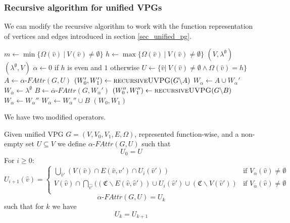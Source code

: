 \subsubsection{Recursive algorithm for unified VPGs}
We can modify the recursive algorithm to work with the function representation of vertices and edges introduced in section \ref{sec_unified_pg}.
\begin{algorithm}[h]
	\caption{$\textsc{recursiveUVPG}(\textit{PG } G = (\\
		V : \hat{V} \rightarrow 2^\mathfrak{C},\\
		V_0 : \hat{V} \rightarrow 2^\mathfrak{C},\\
		V_1 : \hat{V} \rightarrow 2^\mathfrak{C},\\
		E : \hat{E} \rightarrow 2^\mathfrak{C},\\
		\Omega : \hat{V} \rightarrow \mathbb{N}))$}
	\begin{algorithmic}[1]
		\State $m \gets \min\{ \Omega(\hat{v})\ |\ V(\hat{v}) \neq \emptyset \}$
		\State $h \gets \max\{ \Omega(\hat{v})\ |\ V(\hat{v}) \neq \emptyset \}$
		\State \Return $(V,\lambda^\emptyset)$
		\Else
		\State \Return $(\lambda^\emptyset, V)$
		\EndIf
		\EndIf
		\State $\alpha \gets 0$ if $h$ is even and $1$ otherwise
		\State $U \gets \{ \hat{v} |\ V(\hat{v}) \neq \emptyset \wedge \Omega(\hat{v}) = h\}$
		\State $A \gets \alpha\textit{-FAttr}(G, U)$
		\State $(W_0', W_1') \gets \textsc{recursiveUVPG}(G \backslash A)$
		\State $W_\alpha \gets A \cup W_\alpha'$
		\State $W_{\overline{\alpha}} \gets \lambda^\emptyset$
		\Else
		\State $B \gets \overline{\alpha}\textit{-FAttr}(G,W_{\overline{\alpha}}')$
		\State $(W_0'', W_1'') \gets \textsc{recursiveUVPG}(G \backslash B)$
		\State $W_\alpha \gets W_\alpha''$
		\State $W_{\overline{\alpha}} \gets W_{\overline{\alpha}}'' \cup B$
		\EndIf
		\State \Return $(W_0, W_1)$
	\end{algorithmic}
\end{algorithm}
We have two modified operators.
\begin{definition}
		\label{def_Uattr}Given unified VPG $G = (V, V_0,V_1,E,\Omega)$, represented function-wise, and a non-empty set $U \subseteq V$ we define $\alpha\textit{-FAttr}(G,U)$ such that
	\[U_0 = U \]
	For $i \geq 0$:
	\[
	U_{i+1}(\hat{v}) = \begin{cases}
\bigcup_{\hat{v}'} (V(\hat{v}) \cap E(\hat{v},\hat{v}') \cap U_i(\hat{v}')) & \text{if } V_{\alpha}(\hat{v}) \neq \emptyset \\
V(\hat{v}) \cap \bigcap_{\hat{v'}}((\mathfrak{C} \backslash E(\hat{v},\hat{v}')) \cup U_i(\hat{v}') \cup (\mathfrak{C}\backslash V(\hat{v}')) & \text{if } V_{\overline{\alpha}}(\hat{v}) \neq \emptyset \\
	\end{cases}
	\]
	\[\alpha\textit{-FAttr}(G,U) = U_k \]
	such that for $k$ we have
	\[U_k = U_{k+1} \]
\end{definition}

